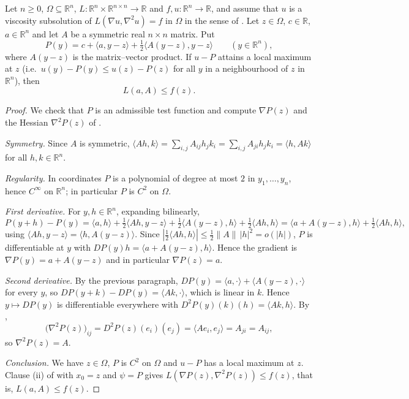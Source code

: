 \begin{lemma}
Let $n\ge0$, $\Omega\subseteq\mathbb R^n$, $L:\mathbb R^n\times\mathbb R^{n\times n}\to\mathbb R$ and $f,u:\mathbb R^n\to\mathbb R$, and assume that $u$ is a viscosity subsolution of $L(\nabla u,\nabla^2u)=f$ in $\Omega$ in the sense of . Let $z\in\Omega$, $c\in\mathbb R$, $a\in\mathbb R^n$ and let $A$ be a symmetric real $n\times n$ matrix. Put
\[
P(y)=c+\langle a,y-z\rangle+\tfrac12\langle A(y-z),y-z\rangle\qquad(y\in\mathbb R^n),
\]
where $A(y-z)$ is the matrix--vector product. If $u-P$ attains a local maximum at $z$ (i.e.\ $u(y)-P(y)\le u(z)-P(z)$ for all $y$ in a neighbourhood of $z$ in $\mathbb R^n$), then
\[
L(a,A)\le f(z).
\]
\end{lemma}
\begin{proof}
We check that $P$ is an admissible test function and compute $\nabla P(z)$ and the Hessian $\nabla^2P(z)$ of .

\emph{Symmetry.} Since $A$ is symmetric, $\langle Ah,k\rangle=\sum_{i,j}A_{ij}h_jk_i=\sum_{i,j}A_{ji}h_jk_i=\langle h,Ak\rangle$ for all $h,k\in\mathbb R^n$.

\emph{Regularity.} In coordinates $P$ is a polynomial of degree at most $2$ in $y_1,\dots,y_n$, hence $C^\infty$ on $\mathbb R^n$; in particular $P$ is $C^2$ on $\Omega$.

\emph{First derivative.} For $y,h\in\mathbb R^n$, expanding bilinearly,
\[
P(y+h)-P(y)=\langle a,h\rangle+\tfrac12\langle Ah,y-z\rangle+\tfrac12\langle A(y-z),h\rangle+\tfrac12\langle Ah,h\rangle
=\langle a+A(y-z),h\rangle+\tfrac12\langle Ah,h\rangle ,
\]
using $\langle Ah,y-z\rangle=\langle h,A(y-z)\rangle$. Since $|\tfrac12\langle Ah,h\rangle|\le\tfrac12\|A\|\,|h|^2=o(|h|)$, $P$ is differentiable at $y$ with $DP(y)h=\langle a+A(y-z),h\rangle$. Hence the gradient is $\nabla P(y)=a+A(y-z)$ and in particular $\nabla P(z)=a$.

\emph{Second derivative.} By the previous paragraph, $DP(y)=\langle a,\cdot\rangle+\langle A(y-z),\cdot\rangle$ for every $y$, so $DP(y+k)-DP(y)=\langle Ak,\cdot\rangle$, which is linear in $k$. Hence $y\mapsto DP(y)$ is differentiable everywhere with $D^2P(y)(k)(h)=\langle Ak,h\rangle$. By ,
\[
\bigl(\nabla^2P(z)\bigr)_{ij}=D^2P(z)(e_i)(e_j)=\langle Ae_i,e_j\rangle=A_{ji}=A_{ij},
\]
so $\nabla^2P(z)=A$.

\emph{Conclusion.} We have $z\in\Omega$, $P$ is $C^2$ on $\Omega$ and $u-P$ has a local maximum at $z$. Clause (ii) of  with $x_0=z$ and $\psi=P$ gives $L(\nabla P(z),\nabla^2P(z))\le f(z)$, that is, $L(a,A)\le f(z)$.
\end{proof}
